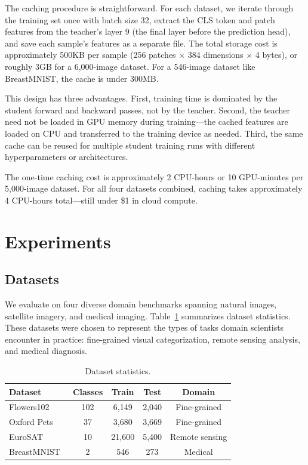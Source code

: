 \documentclass{article}
\begin{document}
The caching procedure is straightforward. For each dataset, we iterate through the training set once with batch size 32, extract the CLS token and patch features from the teacher's layer 9 (the final layer before the prediction head), and save each sample's features as a separate file. The total storage cost is approximately 500KB per sample (256 patches $\times$ 384 dimensions $\times$ 4 bytes), or roughly 3GB for a 6,000-image dataset. For a 546-image dataset like BreastMNIST, the cache is under 300MB.

This design has three advantages. First, training time is dominated by the student forward and backward passes, not by the teacher. Second, the teacher need not be loaded in GPU memory during training---the cached features are loaded on CPU and transferred to the training device as needed. Third, the same cache can be reused for multiple student training runs with different hyperparameters or architectures.

The one-time caching cost is approximately 2 CPU-hours or 10 GPU-minutes per 5,000-image dataset. For all four datasets combined, caching takes approximately 4 CPU-hours total---still under \$1 in cloud compute.

\section{Experiments}
\label{sec:experiments}

\subsection{Datasets}

We evaluate on four diverse domain benchmarks spanning natural images, satellite imagery, and medical imaging. Table~\ref{tab:datasets} summarizes dataset statistics. These datasets were chosen to represent the types of tasks domain scientists encounter in practice: fine-grained visual categorization, remote sensing analysis, and medical diagnosis.

\begin{table}[ht]
\centering
\caption{Dataset statistics.}
\label{tab:datasets}
\small
\begin{tabular}{lcccc}
\toprule
Dataset & Classes & Train & Test & Domain \\
\midrule
Flowers102~\cite{flowers102} & 102 & 6,149 & 2,040 & Fine-grained \\
Oxford Pets~\cite{oxford_pets} & 37 & 3,680 & 3,669 & Fine-grained \\
EuroSAT~\cite{eurosat} & 10 & 21,600 & 5,400 & Remote sensing \\
BreastMNIST~\cite{breastmnist} & 2 & 546 & 273 & Medical \\
\bottomrule
\end{tabular}
\end{table}
\end{document}
